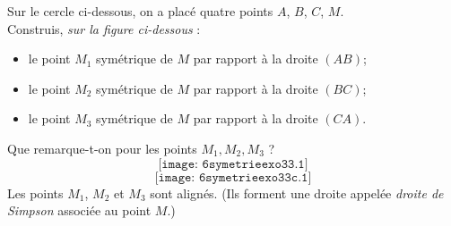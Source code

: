 Sur le cercle ci-dessous, on a placé quatre points $A$, $B$, $C$, $M$.
\\Construis, {\em sur la figure ci-dessous} :
\begin{itemize}
\item le point $M_1$ symétrique de $M$ par rapport à la droite $(AB)$;
\item le point $M_2$ symétrique de $M$ par rapport à la droite $(BC)$;
\item le point $M_3$ symétrique de $M$ par rapport à la droite $(CA)$.
\end{itemize}
Que remarque-t-on pour les points $M_1,M_2,M_3$ ?
\[\texttt{[image: 6symetrieexo33.1]}\]
\[\texttt{[image: 6symetrieexo33c.1]}\]
Les points $M_1$, $M_2$ et $M_3$ sont alignés. (Ils forment une droite appelée {\em droite de Simpson} associée au point $M$.)